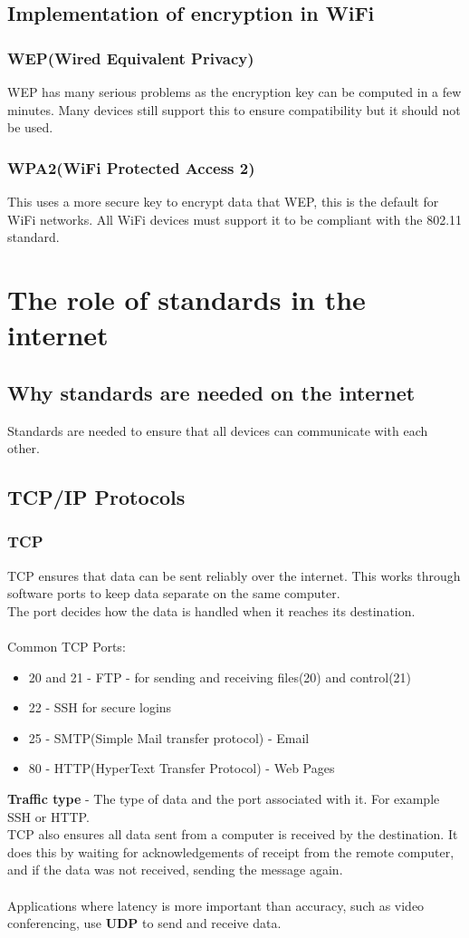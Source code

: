 \documentclass{article}[18pt]
\begin{document}
\subsection{Implementation of encryption in WiFi}
\subsubsection{WEP(Wired Equivalent Privacy)}
WEP has many serious problems as the encryption key can be computed in a few minutes. Many devices still support this to ensure compatibility but it should not be used.
\subsubsection{WPA2(WiFi Protected Access 2)}
This uses a more secure key to encrypt data that WEP, this is the default for WiFi networks. All WiFi devices must support it to be compliant with the 802.11 standard.
\section{The role of standards in the internet}
\subsection{Why standards are needed on the internet}
Standards are needed to ensure that all devices can communicate with each other.
\subsection{TCP/IP Protocols}
\subsubsection{TCP}
TCP ensures that data can be sent reliably over the internet. This works through software ports to keep data separate on the same computer.\\
The port decides how the data is handled when it reaches its destination.\\
\\
Common TCP Ports:
\begin{itemize}
\item 20 and 21 - FTP - for sending and receiving files(20) and control(21)
\item 22 - SSH for secure logins
\item 25 - SMTP(Simple Mail transfer protocol) - Email
\item 80 - HTTP(HyperText Transfer Protocol) - Web Pages
\end{itemize}
\textbf{Traffic type} - The type of data and the port associated with it. For example SSH or HTTP.
\\
TCP also ensures all data sent from a computer is received by the destination. It does this by waiting for acknowledgements of receipt from the remote computer, and if the data was not received, sending the message again.\\
\\
Applications where latency is more important than accuracy, such as video conferencing, use \textbf{UDP} to send and receive data.
\end{document}
